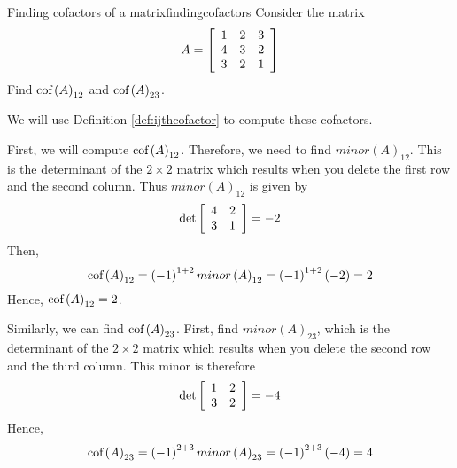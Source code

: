 \begin{example}{Finding cofactors of a matrix}{findingcofactors}
Consider the matrix
\begin{equation*}
A=\left[
\begin{array}{rrr}
1 & 2 & 3 \\
4 & 3 & 2 \\
3 & 2 & 1
\end{array}
\right] 
\end{equation*}
Find $\mbox{cof}\left( A\right) _{12}$ and $\mbox{cof}\left( A\right) _{23}$.
\end{example}

\begin{solution} We will use Definition \ref{def:ijthcofactor} to compute these cofactors. 

First, we will compute $\mbox{cof}\left( A\right) _{12}$. 
Therefore, we need to find $minor\left(A\right)_{12}$. This is the determinant of the $2\times 2$ matrix
which results when you delete the first row and the second column. Thus $minor\left(A\right)_{12}$ is given by 
\begin{equation*}
\det \left[
\begin{array}{rr}
4 & 2 \\
3 & 1
\end{array}
\right] = -2
\end{equation*}
Then,
\begin{equation*}
\mbox{cof}\left( A\right) _{12}=\left( -1\right) ^{1+2} minor\left(A\right)_{12} =\left( -1\right) ^{1+2}\left( -2\right) =2
\end{equation*}
Hence, $\mbox{cof}\left( A\right) _{12}=2$.

Similarly, we can find $\mbox{cof}\left( A\right) _{23}$. First, find $minor\left(A\right)_{23}$, which is the determinant of the $2\times 2$ matrix
which results when you delete the second row and the third column. This
minor is therefore
\begin{equation*}
\det \left[
\begin{array}{rr}
1 & 2 \\
3 & 2
\end{array}
\right] = -4
\end{equation*}
Hence,
\begin{equation*}
\mbox{cof}\left( A\right) _{23}=\left( -1\right) ^{2+3} minor\left(A\right)_{23} =\left( -1\right) ^{2+3}\left( -4\right) =4
\end{equation*}
\end{solution}

